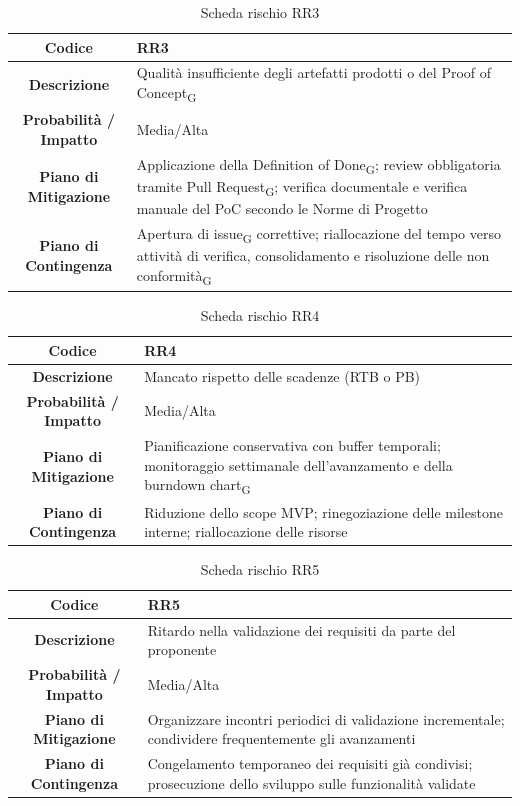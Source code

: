 \begin{table}[H]
	\centering
	\renewcommand{\arraystretch}{1.3}
	\begin{tabularx}{\textwidth}{|c|X|}
		\hline
		\textbf{Codice} & \textbf{RR3} \\
		\hline
		\textbf{Descrizione} & Qualità insufficiente degli artefatti prodotti o del Proof of Concept\textsubscript{G} \\
		\hline
		\textbf{Probabilità / Impatto} & Media/Alta \\
		\hline
		\textbf{Piano di Mitigazione} & Applicazione della Definition of Done\textsubscript{G}; review obbligatoria tramite Pull Request\textsubscript{G}; verifica documentale e verifica manuale del PoC secondo le Norme di Progetto \\
		\hline
		\textbf{Piano di Contingenza} & Apertura di issue\textsubscript{G} correttive; riallocazione del tempo verso attività di verifica, consolidamento e risoluzione delle non conformità\textsubscript{G} \\
		\hline
	\end{tabularx}
	\caption{Scheda rischio RR3}
\end{table}

\begin{table}[H]
	\centering
	\renewcommand{\arraystretch}{1.3}
	\begin{tabularx}{\textwidth}{|c|X|}
		\hline
		\textbf{Codice} & \textbf{RR4} \\
		\hline
		\textbf{Descrizione} & Mancato rispetto delle scadenze (RTB o PB) \\
		\hline
		\textbf{Probabilità / Impatto} & Media/Alta \\
		\hline
		\textbf{Piano di Mitigazione} & Pianificazione conservativa con buffer temporali; monitoraggio settimanale dell'avanzamento e della burndown chart\textsubscript{G} \\
		\hline
		\textbf{Piano di Contingenza} & Riduzione dello scope MVP; rinegoziazione delle milestone interne; riallocazione delle risorse \\
		\hline
	\end{tabularx}
	\caption{Scheda rischio RR4}
\end{table}

\begin{table}[H]
	\centering
	\renewcommand{\arraystretch}{1.3}
	\begin{tabularx}{\textwidth}{|c|X|}
		\hline
		\textbf{Codice} & \textbf{RR5} \\
		\hline
		\textbf{Descrizione} & Ritardo nella validazione dei requisiti da parte del proponente \\
		\hline
		\textbf{Probabilità / Impatto} & Media/Alta \\
		\hline
		\textbf{Piano di Mitigazione} & Organizzare incontri periodici di validazione incrementale; condividere frequentemente gli avanzamenti \\
		\hline
		\textbf{Piano di Contingenza} & Congelamento temporaneo dei requisiti già condivisi; prosecuzione dello sviluppo sulle funzionalità validate \\
		\hline
	\end{tabularx}
	\caption{Scheda rischio RR5}
\end{table}

